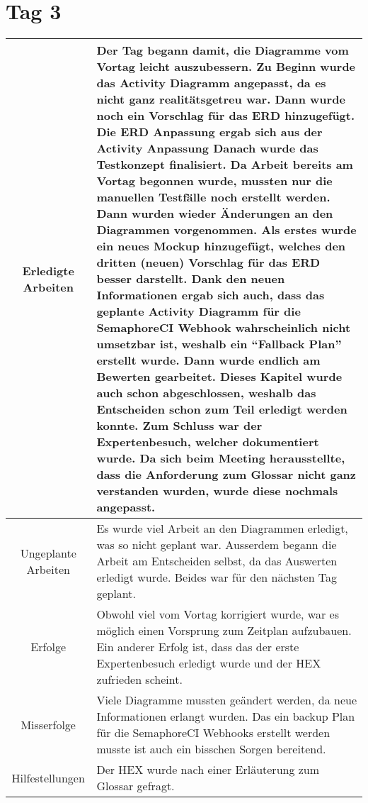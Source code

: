 \section{Tag 3}
\begin{tabularx}{\textwidth}[H]{|c|X|}
  \hline
  Erledigte Arbeiten & Der Tag begann damit, die Diagramme vom Vortag leicht auszubessern. Zu
  Beginn wurde das Activity Diagramm angepasst, da es nicht ganz realitätsgetreu war. Dann wurde
  noch ein Vorschlag für das ERD hinzugefügt. Die ERD Anpassung ergab sich aus der Activity
  Anpassung \newline
  Danach wurde das Testkonzept finalisiert. Da Arbeit bereits am Vortag begonnen wurde, mussten
  nur die manuellen Testfälle noch erstellt werden. \newline
  Dann wurden wieder Änderungen an den Diagrammen vorgenommen. Als erstes wurde ein neues Mockup
  hinzugefügt, welches den dritten (neuen) Vorschlag für das ERD besser darstellt. Dank den neuen
  Informationen ergab sich auch, dass das geplante Activity Diagramm für die SemaphoreCI Webhook
  wahrscheinlich nicht umsetzbar ist, weshalb ein \enquote{Fallback Plan} erstellt wurde. \newline
  Dann wurde endlich am Bewerten gearbeitet. Dieses Kapitel wurde auch schon abgeschlossen, weshalb
  das Entscheiden schon zum Teil erledigt werden konnte. \newline
  Zum Schluss war der Expertenbesuch, welcher dokumentiert wurde. Da sich beim Meeting herausstellte,
  dass die Anforderung zum Glossar nicht ganz verstanden wurden, wurde diese nochmals angepasst. \\ \hline
  Ungeplante Arbeiten & Es wurde viel Arbeit an den Diagrammen erledigt, was so nicht geplant war. Ausserdem
  begann die Arbeit am Entscheiden selbst, da das Auswerten erledigt wurde. Beides war für den nächsten Tag
  geplant. \\ \hline
  Erfolge & Obwohl viel vom Vortag korrigiert wurde, war es möglich einen Vorsprung zum Zeitplan aufzubauen.
  Ein anderer Erfolg ist, dass das der erste Expertenbesuch erledigt wurde und der HEX zufrieden scheint. \\ \hline
  Misserfolge & Viele Diagramme mussten geändert werden, da neue Informationen erlangt wurden. Das ein backup
  Plan für die SemaphoreCI Webhooks erstellt werden musste ist auch ein bisschen Sorgen bereitend. \\ \hline
  Hilfestellungen & Der HEX wurde nach einer Erläuterung zum Glossar gefragt. \\ \hline
\end{tabularx}

